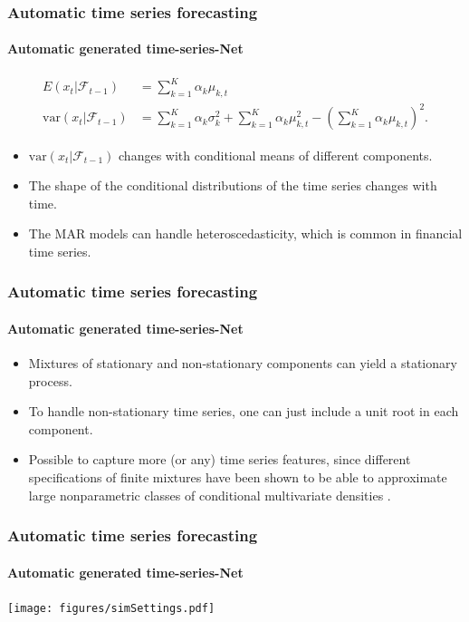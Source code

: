 \documentclass[10pt,aspectratio=43]{beamer}
\begin{document}
\begin{frame}
  \frametitle{Automatic time series forecasting}
  \framesubtitle{Automatic generated time-series-Net}

  \begin{align*}
    E(x_t|\mathcal{F}_{t-1}) &= \sum\limits_{k=1}^K\alpha_k \mu_{k, t}\\
    \mathrm{var}(x_t|\mathcal{F}_{t-1}) &= \sum\limits_{k=1}^K\alpha_k \sigma_k^2 +
                                          \sum\limits_{k=1}^K\alpha_k \mu_{k, t}^2 - \left(\sum\limits_{k=1}^K\alpha_k
                                          \mu_{k, t}\right)^2.
  \end{align*}

  \begin{itemize}
  \item
    \(\mathrm{var}(x_t|\mathcal{F}_{t-1})\) changes with conditional means
    of different components.
  \item
    The shape of the conditional distributions of the time series changes
    with time.
  \item
    The MAR models can handle heteroscedasticity, which is common in
    financial time series.
  \end{itemize}

\end{frame}

\begin{frame}
    \frametitle{Automatic time series forecasting}
  \framesubtitle{Automatic generated time-series-Net}

  \begin{itemize}
  \item
    Mixtures of stationary and non-stationary components can yield a
    stationary process.
  \item
    To handle non-stationary time series, one can just include a unit root
    in each component.
  \item
    Possible to capture more (or any) time series features, since
    different specifications of finite mixtures have been shown to be able
    to approximate large nonparametric classes of conditional multivariate
    densities \citep{jiang1999on, li2010flexible, norets2010approximation}.
  \end{itemize}

\end{frame}

\begin{frame}
    \frametitle{Automatic time series forecasting}
  \framesubtitle{Automatic generated time-series-Net}

  \centerline{\texttt{[image: figures/simSettings.pdf]}}

\end{frame}
\end{document}
